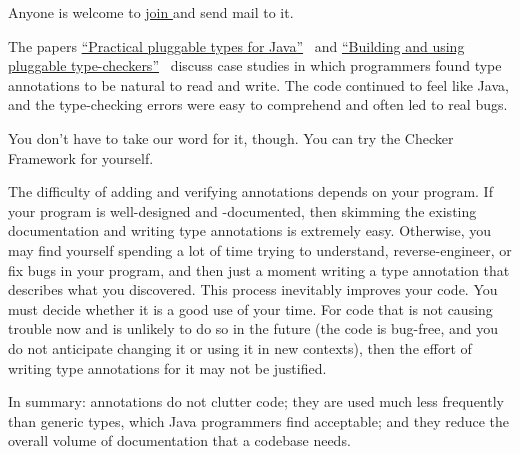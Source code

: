 Anyone is welcome to
\href{https://groups.google.com/forum/#!forum/checker-framework-discuss}{join
  } and send mail to it.





The papers
\href{https://homes.cs.washington.edu/~mernst/pubs/pluggable-checkers-issta2008-abstract.html}{``Practical
  pluggable types for Java''}~\cite{PapiACPE2008}
and
\href{https://homes.cs.washington.edu/~mernst/pubs/pluggable-checkers-icse2011-abstract.html}{``Building
  and using pluggable type-checkers''}~\cite{DietlDEMS2011}
discuss case studies in
which programmers
found type annotations to be natural to read and write.  The code
continued to feel like Java, and the type-checking errors were easy to
comprehend and often led to real bugs.

You don't have to take our word for it, though.  You can try the
Checker Framework for yourself.

The difficulty of adding and verifying annotations depends on your program.
If your program is well-designed and -documented, then skimming the
existing documentation and writing type annotations is extremely easy.
Otherwise, you may find yourself spending a lot of time trying to
understand, reverse-engineer, or fix bugs in your program, and then just a
moment writing a type annotation that describes what you discovered.  This
process inevitably improves your code.  You must decide whether it is a
good use of your time.  For code that is not causing trouble now and is
unlikely to do so in the future (the code is bug-free, and you do not
anticipate changing it or using it in new contexts), then the
effort of writing type annotations for it may not be justified.




In summary:  annotations do not clutter code; they are used much
less frequently than generic types, which Java programmers find acceptable;
and they reduce the overall volume of documentation that a codebase needs.

